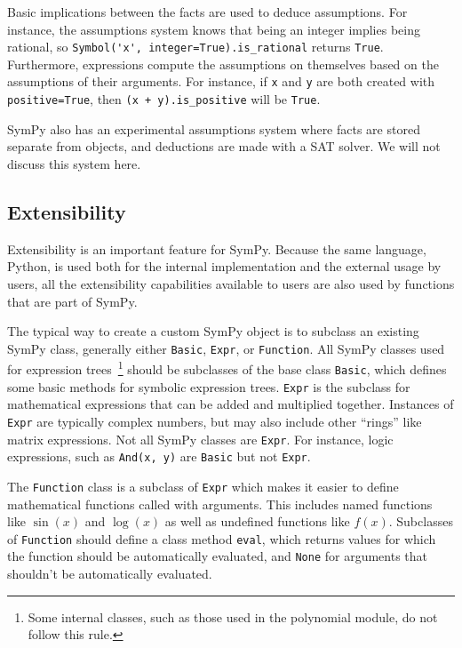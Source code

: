 Basic implications between the facts are used to deduce assumptions. For
instance, the assumptions system knows that being an integer implies being
rational, so \verb|Symbol('x', integer=True).is_rational| returns
\texttt{True}. Furthermore, expressions compute the assumptions on themselves
based on the assumptions of their arguments. For instance, if \texttt{x} and
\texttt{y} are both created with \texttt{positive=True}, then \verb|(x + y).is_positive|
will be \texttt{True}.

SymPy also has an experimental assumptions system where facts are stored
separate from objects, and deductions are made with a SAT solver. We will not
discuss this system here.

\subsection{Extensibility}

Extensibility is an important feature for SymPy. Because the same language,
Python, is used both for the internal implementation and the external usage by
users, all the extensibility capabilities available to users are also used by
functions that are part of SymPy.

The typical way to create a custom SymPy object is to subclass an existing
SymPy class, generally either \texttt{Basic}, \texttt{Expr}, or
\texttt{Function}. All SymPy classes used for expression trees~\footnote{Some
  internal classes, such as those used in the polynomial module, do not follow
  this rule.} should be subclasses of the base class
\texttt{Basic}, which defines some basic methods for symbolic expression
trees. \texttt{Expr} is the subclass for mathematical expressions that can be
added and multiplied together. Instances of \texttt{Expr} are typically
complex numbers, but may also include other ``rings'' like matrix expressions.
Not all SymPy classes are \texttt{Expr}. For instance, logic expressions, such
as \verb|And(x, y)| are \texttt{Basic} but not \texttt{Expr}.

The \texttt{Function} class is a subclass of \texttt{Expr} which makes it
easier to define mathematical functions called with arguments. This includes
named functions like $\sin(x)$ and $\log(x)$ as well as undefined functions
like $f(x)$. Subclasses of \texttt{Function} should define a
class method \texttt{eval}, which returns values for which the function should
be automatically evaluated, and \texttt{None} for arguments that shouldn't be
automatically evaluated.

